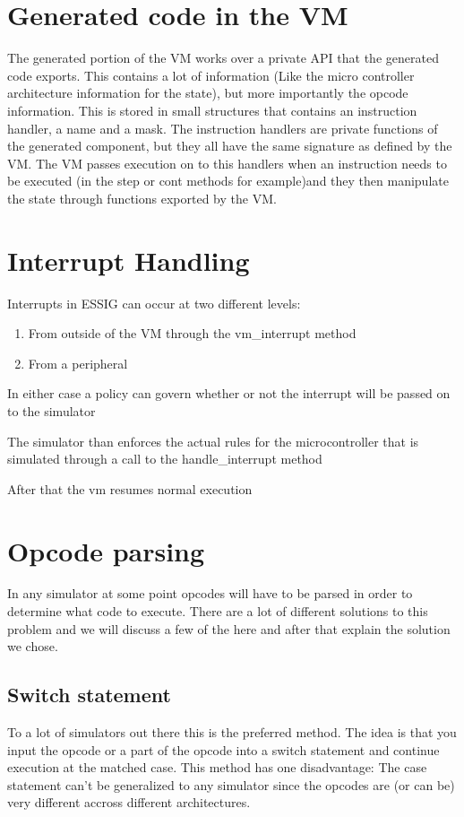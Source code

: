 \section{Generated code in the VM}
The generated portion of the VM works over a private API that the
generated code exports. This contains a lot of information (Like the
micro controller architecture information for the state), but more
importantly the opcode information. This is stored in small structures
that contains an instruction handler, a name and a mask. The
instruction handlers are private functions of the generated component,
but they all have the same signature as defined by the VM. The VM
passes execution on to this handlers when an instruction needs to be
executed (in the step or cont methods for example)and they then
manipulate the state through functions exported by the VM.

\section[Interrupt Handling]{Interrupt Handling}
Interrupts in \ac{ESSIG} can occur at two different levels:

\begin{enumerate}
\item {
From outside of the VM through the vm\_interrupt method }
\item {
From a peripheral }
\end{enumerate}
In either case a policy can govern whether or not the interrupt will be
passed on to the simulator

The simulator than enforces the actual rules for the microcontroller
that is simulated through a call to the handle\_interrupt method

After that the vm resumes normal execution
\section[Opcode parsing]{Opcode parsing}
In any simulator at some point opcodes will have to be parsed in order
to determine what code to execute. There are a lot of different
solutions to this problem and we will discuss a few of the here and
after that explain the solution we chose.

\subsection[Switch statement]{Switch statement}
To a lot of simulators out there this is the preferred method. The idea
is that you input the opcode or a part of the opcode into a switch
statement and continue execution at the matched case. This method has
one disadvantage: The case statement can't be generalized to any
simulator since the opcodes are (or can be) very different accross
different architectures.

